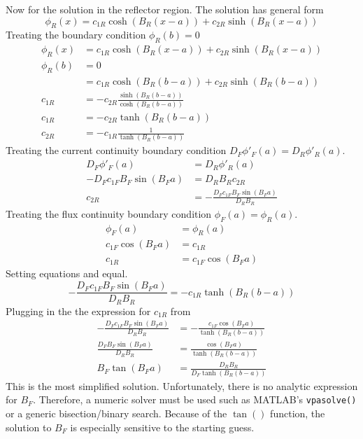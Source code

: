   Now for the solution in the reflector region. The solution has general form
  \begin{equation}
    \phi_R(x) = c_{1R} \cosh(B_R (x-a)) + c_{2R} \sinh(B_R (x-a))
  \end{equation}
  Treating the boundary condition $\phi_R(b)=0$
  \begin{align}
    \phi_R(x) &= c_{1R} \cosh(B_R (x-a)) + c_{2R} \sinh(B_R (x-a))\\
    \phi_R(b) &= 0 \\
    &= c_{1R} \cosh(B_R(b-a)) + c_{2R} \sinh(B_R(b-a))\\
    c_{1R} &= -c_{2R} \frac{\sinh(B_R(b-a))}{\cosh(B_R(b-a))}\\
    c_{1R} &= -c_{2R} \tanh(B_R(b-a))\\
    c_{2R} &= -c_{1R} \frac{1}{\tanh(B_R(b-a))} \label{eq:c2rnumber1}
  \end{align}
  Treating the current continuity boundary condition
  $D_F \phi'_F(a) = D_R \phi'_R(a)$.
  \begin{align}
    D_F \phi'_F(a) &= D_R \phi'_R(a) \\
    -D_F c_{1F} B_F \sin(B_F a) &= D_R B_R c_{2R} \\
    c_{2R} &= -\frac{D_F c_{1F} B_F \sin(B_F a)}{D_R B_R} \label{eq:c2rnumber2}
  \end{align}
  Treating the flux continuity boundary condition $\phi_F(a)=\phi_R(a)$.
  \begin{align}
    \phi_F(a)&=\phi_R(a) \\
    c_{1F} \cos(B_F a) &= c_{1R} \\
    c_{1R} &= c_{1F} \cos(B_F a) \label{eq:c1r}
  \end{align}
  Setting equations  and  equal.
  \begin{equation}
    - \frac{D_F c_{1F} B_F \sin(B_F a)}{D_R B_R} = -c_{1R} \tanh(B_R(b-a))
  \end{equation}
  Plugging in the the expression for $c_{1R}$ from 
  \begin{align}
    - \frac{D_F c_{1F} B_F \sin(B_F a)}{D_R B_R} &=
      - \frac{c_{1F} \cos(B_F a)}{\tanh(B_R(b-a))}\\
    \frac{D_F B_F \sin(B_F a)}{D_R B_R} &= 
      \frac{\cos(B_F a)}{\tanh(B_R(b-a))} \\
    B_F \tan(B_F a) &= \frac{D_R B_R}{D_F \tanh(B_R(b-a))}
  \end{align}
  This is the most simplified solution. Unfortunately, there is no analytic
  expression for $B_F$. Therefore, a numeric solver must be used such as 
  MATLAB's \verb|vpasolve()| or a generic bisection/binary search. Because of
  the $\tan()$ function, the solution to $B_F$ is especially sensitive to the
  starting guess.
  
